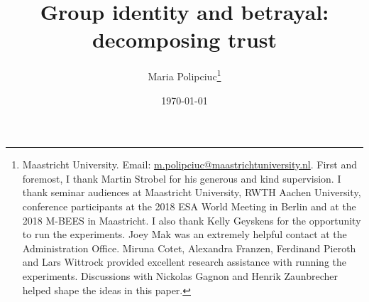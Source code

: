 \usepackage{preliminary}

\title{Group identity and betrayal: decomposing trust}
\author{Maria Polipciuc\thanks{Maastricht University. Email: \url{m.polipciuc@maastrichtuniversity.nl}. First and foremost, I thank Martin Strobel for his generous and kind supervision. I thank seminar audiences at Maastricht University, RWTH Aachen University, conference participants at the 2018 ESA World Meeting in Berlin and at the 2018 M-BEES in Maastricht. I also thank Kelly Geyskens for the opportunity to run the experiments. Joey Mak was an extremely helpful contact at the Administration Office. Miruna Cotet, Alexandra Franzen, Ferdinand Pieroth and Lars Wittrock provided excellent research assistance with running the experiments. Discussions with Nickolas Gagnon and Henrik Zaunbrecher helped shape the ideas in this paper.}}
\date{\today	\vspace{1cm}}
\titlepage



